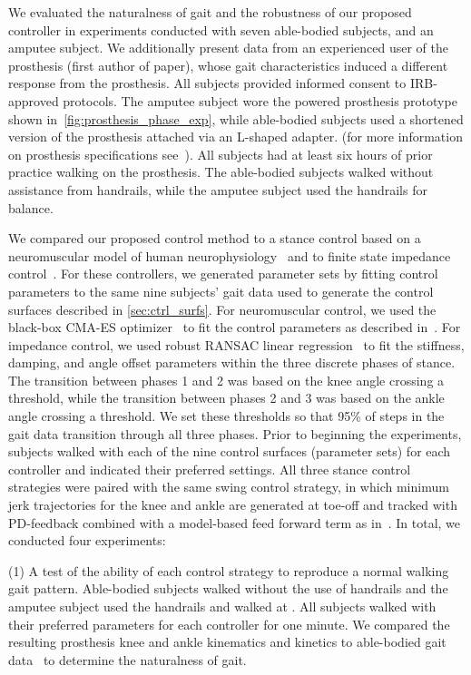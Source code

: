 We evaluated the naturalness of gait and the robustness of our proposed
controller in experiments conducted with seven able-bodied subjects, and an
amputee subject. We additionally present data from an experienced user of the
prosthesis (first author of paper), whose gait characteristics induced a
different response from the prosthesis. All subjects provided informed consent
to IRB-approved protocols.  The amputee subject wore the powered prosthesis
prototype shown in~\cref{fig:prosthesis_phase_exp}, while able-bodied subjects
used a shortened version of the prosthesis attached via an L-shaped adapter.
(for more information on prosthesis specifications
see~\citep{thatte2018method}). All subjects had at least six hours of prior
practice walking on the prosthesis. The able-bodied subjects walked without
assistance from handrails, while the amputee subject used the handrails for
balance.

We compared our proposed control method to a stance control based on a
neuromuscular model of human neurophysiology~\citep{thatte2018method} and to
finite state impedance control~\citep{lawson2014robotic}. For these controllers,
we generated parameter sets by fitting control parameters to the same nine
subjects' gait data used to generate the control surfaces described in
\cref{sec:ctrl_surfs}. For neuromuscular control, we used the black-box CMA-ES
optimizer~\citep{hansen2006cma} to fit the control parameters as described
in~\citep{thatte2018method}. For impedance control, we used robust RANSAC linear
regression~\citep{fischler1981random} to fit the stiffness, damping, and angle
offset parameters within the three discrete phases of stance. The transition
between phases 1 and 2 was based on the knee angle crossing a threshold, while
the transition between phases 2 and 3 was based on the ankle angle crossing a
threshold. We set these thresholds so that 95\% of steps in the gait data
transition through all three phases. Prior to beginning the experiments,
subjects walked with each of the nine control surfaces (parameter sets) for each
controller and indicated their preferred settings. All three stance control
strategies were paired with the same swing control strategy, in which minimum
jerk trajectories for the knee and ankle are generated at toe-off and tracked
with PD-feedback combined with a model-based feed forward term as
in~\citep{lenzi2014speed}. In total, we conducted four experiments: 

(1) A test of the ability of each control strategy to reproduce a normal walking
gait pattern.  Able-bodied subjects walked without the use of handrails
 and the amputee subject used the handrails and walked at
.  All subjects walked with their preferred parameters for
each controller for one minute. We compared the resulting prosthesis knee and
ankle kinematics and kinetics to able-bodied gait data~\citep{bovi2011multiple}
to determine the naturalness of gait.

